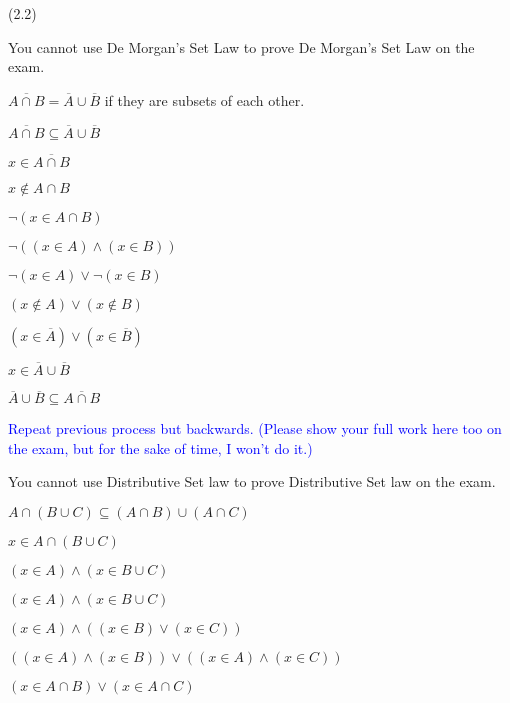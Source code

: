 \documentclass{exam}
\begin{document}
\begin{questions}
 (2.2)
\begin{subparts}

\begin{center}

You cannot use De Morgan's Set Law to prove De Morgan's Set Law on the exam.

\( \overline{A \cap B} = \overline{A} \cup \overline{B} \) if they are subsets of each other.

\( \overline{A \cap B} \subseteq \overline{A} \cup \overline{B} \)

\( x \in \overline{A \cap B} \)

\( x \notin {A \cap B} \)

\( \neg (x \in {A \cap B}) \)

\( \neg ( (x \in A) \land (x \in B) ) \)

\( \neg(x \in A) \lor \neg (x \in B) \)

\( (x \notin A) \lor (x \notin B) \)

\( (x \in \overline{A}) \lor (x \in \overline{B}) \)

\( x \in \overline{A} \cup \overline{B} \)
\vspace{5mm}

\( \overline{A} \cup \overline{B} \subseteq \overline{A \cap B} \)

\textcolor{blue}{Repeat previous process but backwards. (Please show your full work here too on the exam, but for the sake of time, I won't do it.)}

\end{center}


\begin{center}

You cannot use Distributive Set law to prove Distributive Set law on the exam.

\( A \cap (B \cup C) \subseteq (A \cap B) \cup (A \cap C) \)

\( x \in A \cap (B \cup C)\)

\( (x \in A) \land (x \in B \cup C)\)

\( (x \in A) \land (x \in B \cup C)\)

\( (x \in A) \land ((x \in B) \lor (x \in C))\)

\( ((x \in A) \land (x \in B)) \lor ((x \in A) \land (x \in C))\)

\( (x \in A \cap B) \lor (x \in A \cap C)\)


\end{center}
\end{subparts}
\end{questions}
\end{document}
